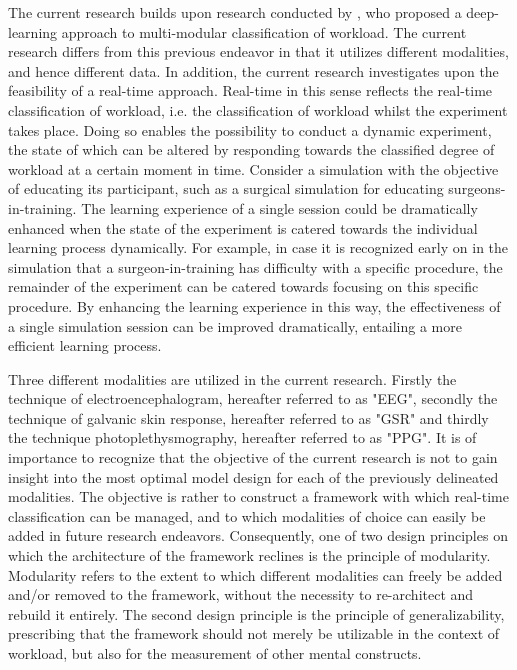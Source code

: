 \documentclass[12pt]{article}
\begin{document}
The current research builds upon research conducted by , who proposed a deep-learning approach to multi-modular classification of workload. The current research differs from this previous endeavor in that it utilizes different modalities, and hence different data. In addition, the current research investigates upon the feasibility of a real-time approach. Real-time in this sense reflects the real-time classification of workload, i.e. the classification of workload whilst the experiment takes place. Doing so enables the possibility to conduct a dynamic experiment, the state of which can be altered by responding towards the classified degree of workload at a certain moment in time. Consider a simulation with the objective of educating its participant, such as a surgical simulation for educating surgeons-in-training. The learning experience of a single session could be dramatically enhanced when the state of the experiment is catered towards the individual learning process dynamically. For example, in case it is recognized early on in the simulation that a surgeon-in-training has difficulty with a specific procedure, the remainder of the experiment can be catered towards focusing on this specific procedure. By enhancing the learning experience in this way, the effectiveness of a single simulation session can be improved dramatically, entailing a more efficient learning process.

Three different modalities are utilized in the current research. Firstly the technique of electroencephalogram, hereafter referred to as "EEG", secondly the technique of galvanic skin response, hereafter referred to as "GSR" and thirdly the technique photoplethysmography, hereafter referred to as "PPG". It is of importance to recognize that the objective of the current research is not to gain insight into the most optimal model design for each of the previously delineated modalities. The objective is rather to construct a framework with which real-time classification can be managed, and to which modalities of choice can easily be added in future research endeavors. Consequently, one of two design principles on which the architecture of the framework reclines is the principle of modularity. Modularity refers to the extent to which different modalities can freely be added and/or removed to the framework, without the necessity to re-architect and rebuild it entirely. The second design principle is the principle of generalizability, prescribing that the framework should not merely be utilizable in the context of workload, but also for the measurement of other mental constructs.
\end{document}
